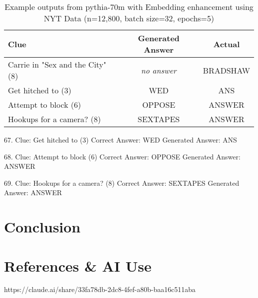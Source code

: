 \documentclass[
	a4paper, %
	10pt, %
	unnumberedsections, %
	twoside, %
]{LTJournalArticle}
\begin{document}
\begin{table*}[h] %
	\centering
	\begin{tabular}{l c c}
		\toprule
		Clue & Generated Answer & Actual \\
		\midrule
		Carrie in "Sex and the City" (8) & \textit{no answer} & BRADSHAW \\
		Get hitched to (3)& WED & ANS \\
		Attempt to block (6) & OPPOSE & ANSWER \\
		Hookups for a camera? (8) & SEXTAPES & ANSWER \\
		\bottomrule
	\end{tabular}
	\label{tab:embeddingtestexamples}
	\caption{Example outputs from pythia-70m with Embedding enhancement using NYT Data (n=12,800, batch size=32, epochs=5)}
\end{table*}


67. Clue: Get hitched to (3)
Correct Answer:   WED
Generated Answer: ANS

68. Clue: Attempt to block (6)
Correct Answer:   OPPOSE
Generated Answer: ANSWER

69. Clue: Hookups for a camera? (8)
Correct Answer:   SEXTAPES
Generated Answer: ANSWER


\section{Conclusion}





\section{References \& AI Use}

https://claude.ai/share/33fa78db-2dc8-4fef-a80b-baa16c511aba
\end{document}
